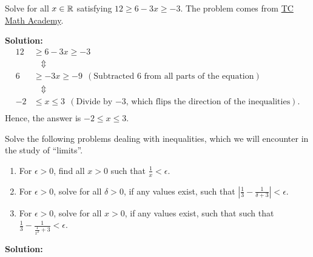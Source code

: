 \Qed

\begin{example} Solve for all $x\in \mathbb R$ satisfying $ 12 \ge 6 - 3x \ge -3$. The problem comes from \href{https://youtu.be/IUnlgv5Hwl4}{TC Math Academy}.
    
\end{example}

\textbf{Solution:} 
\begin{align*}
12 &\ge 6 - 3x \ge -3 \\
& ~~~~\Updownarrow \\
6 &\ge - 3x \ge -9  ~~(\text{Subtracted 6 from all parts of the equation}) \\
 & ~~~ ~\Updownarrow \\
-2 &\le x \le 3  ~~ (\text{Divide by $-3$, which flips the direction of the inequalities}). \\   
\end{align*}
Hence, the answer is $-2 \le x \le 3$.
\Qed

\bigskip

\begin{example}
\label{ex:ManipulatingInequalities02}
Solve the following problems dealing with inequalities, which we will encounter in the study of ``limits''.

\begin{enumerate}
\renewcommand{\labelenumi}{(\alph{enumi})}
\setlength{\itemsep}{.2cm}

\item For $\epsilon >0$, find all $x > 0$ such that $ \frac{1}{x} < \epsilon $.


\item For $\epsilon > 0$, solve for all $\delta>0$, if any values exist, such that $ | \frac{1}{3} - \frac{1}{\delta + 3 } | < \epsilon $.

\item  For $\epsilon > 0$, solve for all $x > 0$, if any values exist, such that such that $ \frac{1}{3} - \frac{1}{\frac{1}{x^2} + 3 } < \epsilon $.
\end{enumerate}    
\end{example}

\textbf{Solution:} 

